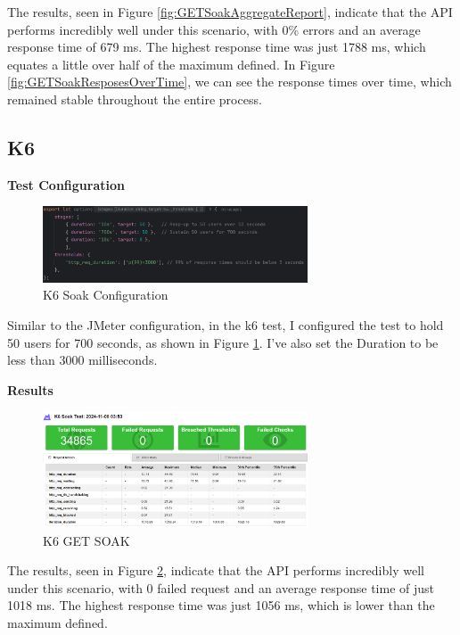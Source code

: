 \documentclass[a4paper,11pt,openright,BCOR=15mm]{scrbook}
\begin{document}
		The results, seen in Figure \ref{fig:GETSoakAggregateReport}, indicate that the API performs incredibly well under this scenario, with 0\% errors and an average response time of 679 ms. The highest response time was just 1788 ms, which equates a little over half of the maximum defined.
		In Figure \ref{fig:GETSoakResposesOverTime}, we can see the response times over time, which remained stable throughout the entire process.





		\subsection{K6}
		\textbf{Test Configuration}
		\begin{figure}[H]
			\centering
			\includegraphics[width=0.7\textwidth]{figs/Performance/Test Configuration/K6-SOAK.png}
			\caption{K6 Soak Configuration}
			\label{fig:K6-Soak}
		\end{figure}
		Similar to the JMeter configuration, in the k6 test, I configured the test to hold 50 users for 700 seconds, as shown in Figure \ref{fig:K6-Soak}. I've also set the Duration to be less than 3000 milliseconds.


		\textbf{Results}
		\begin{figure}[H]
			\centering
			\includegraphics[width=0.7\textwidth]{figs/Performance/Results/K6 GET SOAK.png}
			\caption{K6 GET SOAK}
			\label{fig:K6-GET-SOAK}
		\end{figure}

		The results, seen in Figure \ref{fig:K6-GET-SOAK}, indicate that the API performs incredibly well under this scenario, with 0 failed request and an average response time of just 1018 ms. The highest response time was just 1056 ms, which is lower than the maximum defined.
\end{document}
